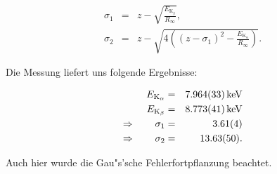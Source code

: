 		\begin{eqnarray}
			\sigma_1 & = & z - \sqrt{\frac{E_\mathrm{K_\beta}}{R_\infty}} , \nonumber \\ 
			\sigma_2 & = & z - \sqrt{4\left(\left( z - \sigma_1 \right)^2 - \frac{E_\mathrm{K_\alpha}}{R_\infty} \right)} . \nonumber
		\end{eqnarray}

		Die Messung liefert uns folgende Ergebnisse:

		\begin{eqnarray}
			E_\mathrm{K_\alpha} & = & \SI{7.964 (33)}{\kilo \electronvolt} \nonumber \\
			E_\mathrm{K_\beta} & = & \SI{8.773 (41)}{\kilo \electronvolt} \nonumber \\
			\Rightarrow \qquad \sigma_1 & = & \SI{3.61 (4)}{} \nonumber \\
			\Rightarrow \qquad \sigma_2 & = & \SI{13.63 (50)}{} . \nonumber
		\end{eqnarray}

		Auch hier wurde die Gau"s'sche Fehlerfortpflanzung beachtet.